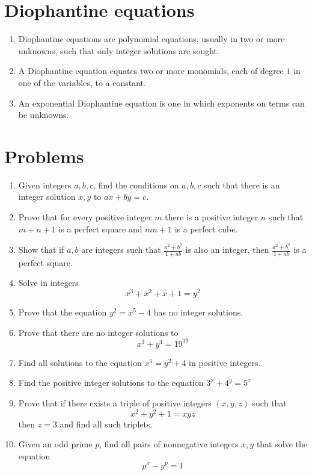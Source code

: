\documentclass{article}
\begin{document}
	
\section*{Diophantine equations}
\begin{enumerate}
	\item 
	Diophantine equations are polynomial equations, usually in two or more unknowns, such that only integer solutions are sought.
	\item 
	A Diophantine equation equates two or more monomials, each of degree $1$ in one of the variables, to a constant.
	\item 
	An exponential Diophantine equation is one in which exponents on terms can be unknowns. 
\end{enumerate}
\section*{Problems}
\begin{enumerate}
	\item 
	Given integers $a,b,c$, find the conditions on $a,b,c$ such that there is an integer solution $x,y$ to
	$ax+by=c$.
	\item %
	Prove that for every positive integer $m$ there is a positive integer $n$ such that $m+n+1$ is a perfect square and $mn+1$ is a perfect cube.
	
	\item %
	Show that if $a,b$ are integers such that $\tfrac{a^2+b^2}{1+ab}$ is also an integer, then $\tfrac{a^2+b^2}{1+ab}$ is a perfect square.
	
	\item %
	Solve in integers
	$$x^3 +x^2 + x + 1 = y^2$$
	
	\item %
	Prove that the equation $y^2=x^5-4$ has no integer solutions.
	
	\item %
	Prove that there are no integer solutions to
	$$x^3 + y^4 = 19^19$$
	
	\item %
	Find all solutions to the equation $x^5 = y^2 + 4$ in positive integers.
	
	\item %
	Find the positive integer solutions to the equation
	$3^x+4^y=5^z$	
	
	\item %
	Prove that if there exists a triple of positive integers $(x,y,z)$ such that 
	$$x^2 + y^2+1 = xyz$$
	then $z=3$ and find all such triplets.
	
	\item %
	Given an odd prime $p$, find all pairs of nonnegative integers $x,y$ that solve the equation
	$$p^x - y^p =1$$
	
\end{enumerate}
\end{document}
